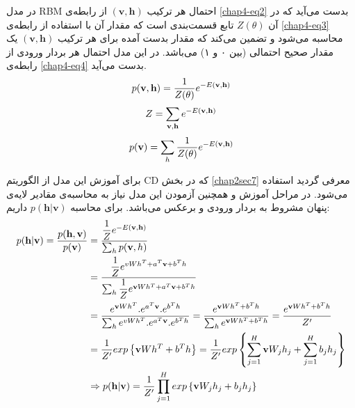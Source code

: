 در مدل
RBM
احتمال هر ترکیب
$(\textbf{v},\textbf{h})$
از رابطه‌ی
\ref{chap4-eq2}
بدست می‌‌آید که در آن
$Z(\theta)$
تابع قسمت‌بندی است که مقدار آن با استفاده از رابطه‌ی 
\ref{chap4-eq3}
محاسبه می‌شود و تضمین می‌کند که مقدار بدست آمده برای هر ترکیب
$(\textbf{v},\textbf{h})$
یک مقدار صحیح احتمالی‌ (بین ۰ و ۱) می‌‌باشد. در این مدل احتمال هر بردار ورودی از رابطه‌ی
\ref{chap4-eq4}
بدست می‌‌آید.
\begin{align}
	\centering
	\label{chap4-eq2}
	p(\textbf{v},\textbf{h}) = \dfrac{1}{Z(\theta)} e^{-E(\textbf{v},\textbf{h})}
\end{align}
\begin{align}
	\centering
	\label{chap4-eq3}
	Z = \sum_{\textbf{v}, \textbf{h}}e^{-E(\textbf{v},\textbf{h})}
\end{align}
\begin{align}
	\centering
	\label{chap4-eq4}
	p(\textbf{v}) = \sum_{h} \dfrac{1}{Z(\theta)} e^{-E(\textbf{v},\textbf{h})}
\end{align}

برای آموزش این مدل از الگوریتم
CD
که در بخش
\ref{chap2sec7}
معرفی‌ گردید استفاده می‌‌شود. در مراحل آموزش و همچنین آزمودن این مدل نیاز به محاسبه‌ی مقادیر لایه‌ی پنهان مشروط به بردار ورودی و برعکس می‌‌باشد. برای محاسبه
$p(\textbf{h}|\textbf{v})$
داریم:
\begin{align}
	\centering
	\label{chap4-eq5}
	p(\textbf{h}|\textbf{v})=\dfrac{p(\textbf{h},\textbf{v})}{p(\textbf{v})} &=\dfrac{\dfrac{1}{Z}e^{-E(\textbf{v},\textbf{h})}}{\sum_{h}p(\textbf{v},h)}\\\nonumber
								&=\dfrac{\dfrac{1}{Z}e^{vWh^{T}+a^{T}\textbf{v}+b^{T}h}}{\sum_{h}\dfrac{1}{Z}e^{\textbf{v}Wh^{T}+a^{T}\textbf{v}+b^{T}h}}\\\nonumber
								&=\dfrac{e^{\textbf{v}Wh^{T}}.e^{a^{T}\textbf{v}}.e^{b^{T}h}}{\sum_{h}e^{vWh^{T}}.e^{a^{T}\textbf{v}}.e^{b^{T}h}}
								=\dfrac{e^{\textbf{v}Wh^{T}+b^{T}h}}{\sum_{h}e^{\textbf{v}Wh^{T}+b^{T}h}}
								=\dfrac{e^{\textbf{v}Wh^{T}+b^{T}h}}{Z'}\\\nonumber
								&=\dfrac{1}{Z'}exp\left\lbrace \textbf{v}Wh^{T}+b^{T}h\right\rbrace
								=\dfrac{1}{Z'}exp \left\lbrace \sum_{j=1}^{H}\textbf{v}W_jh_j + \sum_{j=1}^{H}b_jh_j \right\rbrace\\\nonumber
								&\Rightarrow p(\textbf{h}|\textbf{v})=\dfrac{1}{Z'}\prod_{j=1}^{H}exp\left\lbrace \textbf{v}W_jh_j + b_jh_j \right\rbrace
\end{align}

